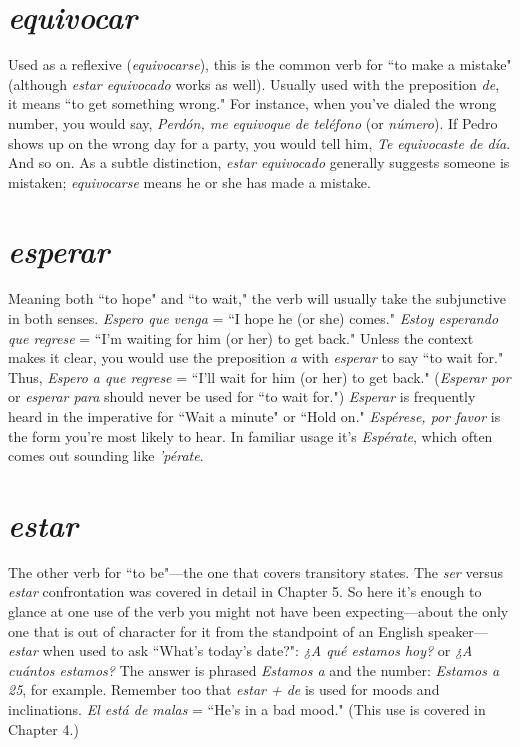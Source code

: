 \section{\emph{equivocar}}

Used as a reflexive (\emph{equivocarse}), this is the common verb for
``to make a mistake" (although \emph{estar equivocado} works as well). Usually used with the preposition \emph{de}, it means ``to get something wrong."
For instance, when you've dialed the wrong number, you would say,
\emph{Perdón, me equivoque de teléfono} (or \emph{número}). If Pedro shows up on
the wrong day for a party, you would tell him, \emph{Te equivocaste de día}.
And so on. As a subtle distinction, \emph{estar equivocado} generally suggests someone is mistaken; \emph{equivocarse} means he or she has made a
mistake.

\section{\emph{esperar}}

Meaning both ``to hope" and ``to wait," the verb will usually
take the subjunctive in both senses. \emph{Espero que venga} = ``I hope he (or
she) comes." \emph{Estoy esperando que regrese} = ``I'm waiting for him (or
her) to get back." Unless the context makes it clear, you would use the
preposition \emph{a} with \emph{esperar} to say ``to wait for." Thus, \emph{Espero a que
regrese} = ``I'll wait for him (or her) to get back." (\emph{Esperar por} or \emph{esperar para} should never be used for ``to wait for.") \emph{Esperar} is frequently
heard in the imperative for ``Wait a minute" or ``Hold on." \emph{Espérese,
por favor} is the form you're most likely to hear. In familiar usage it's
\emph{Espérate}, which often comes out sounding like \emph{'pérate}.

\section{\emph{estar}}

The other verb for ``to be"---the one that covers transitory
states. The \emph{ser} versus \emph{estar} confrontation was covered in detail in
Chapter 5. So here it's enough to glance at one use of the verb you
might not have been expecting---about the only one that is out of character for it from the standpoint of an English speaker---\emph{estar} when
used to ask ``What's today's date?": \emph{¿A qué estamos hoy?} or \emph{¿A cuántos
estamos?} The answer is phrased \emph{Estamos a} and the number: \emph{Estamos
a 25}, for example. Remember too that \emph{estar + de} is used for moods
and inclinations. \emph{El está de malas} = ``He's in a bad mood." (This use
is covered in Chapter 4.)

